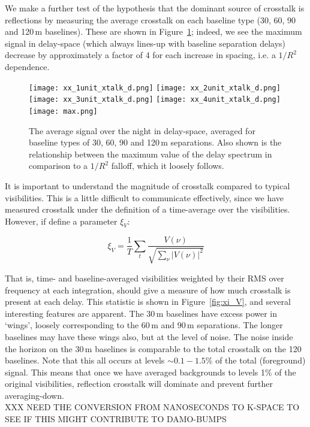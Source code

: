 \documentclass[10pt,a4paper,notitlepage]{article}
\begin{document}
We make a further test of the hypothesis that the dominant source of crosstalk is reflections by measuring the average crosstalk on each baseline type (30, 60, 90 and 120\,m baselines). These are shown in Figure~\ref{fig:the-money-plot}; indeed, we see the maximum signal in delay-space (which always lines-up with baseline separation delays) decrease by approximately a factor of 4 for each increase in spacing, i.e. a $1/R^2$ dependence.\\

\begin{figure}
\centering
\texttt{[image: xx\_1unit\_xtalk\_d.png]}
\texttt{[image: xx\_2unit\_xtalk\_d.png]}
\texttt{[image: xx\_3unit\_xtalk\_d.png]}
\texttt{[image: xx\_4unit\_xtalk\_d.png]}
\texttt{[image: max.png]}
\caption{The average signal over the night in delay-space, averaged for baseline types of 30, 60, 90 and 120\,m separations. Also shown is the relationship between the maximum value of the delay spectrum in comparison to a $1/R^2$ falloff, which it loosely follows.}
\label{fig:the-money-plot}
\end{figure}

It is important to understand the magnitude of crosstalk compared to typical visibilities. This is a little difficult to communicate effectively, since we have measured crosstalk under the definition of a time-average over the visibilities. However, if define a parameter $\xi_V$: 

\begin{equation}
\xi_V=\frac{1}{T}\sum_t\frac{V(\nu)}{\sqrt{\sum_\nu|V(\nu)|^2}}
\end{equation}

That is, time- and baseline-averaged visibilities weighted by their RMS over frequency at each integration, should give a measure of how much crosstalk is present at each delay. This statistic is shown in Figure~\ref{fig:xi_V}, and several interesting features are apparent. The 30\,m baselines have excess power in `wings', loosely corresponding to the 60\,m and 90\,m separations. The longer baselines may have these wings also, but at the level of noise. The noise inside the horizon on the 30\,m baselines is comparable to the total crosstalk on the 120\, baselines.
Note that this all occurs at levels $\sim0.1-1.5\%$ of the total (foreground) signal. This means that once we have averaged backgrounds to levels 1\% of the original visibilities, reflection crosstalk will dominate and prevent further averaging-down. \\
XXX NEED THE CONVERSION FROM NANOSECONDS TO K-SPACE TO SEE IF THIS MIGHT CONTRIBUTE TO DAMO-BUMPS\\
\end{document}
